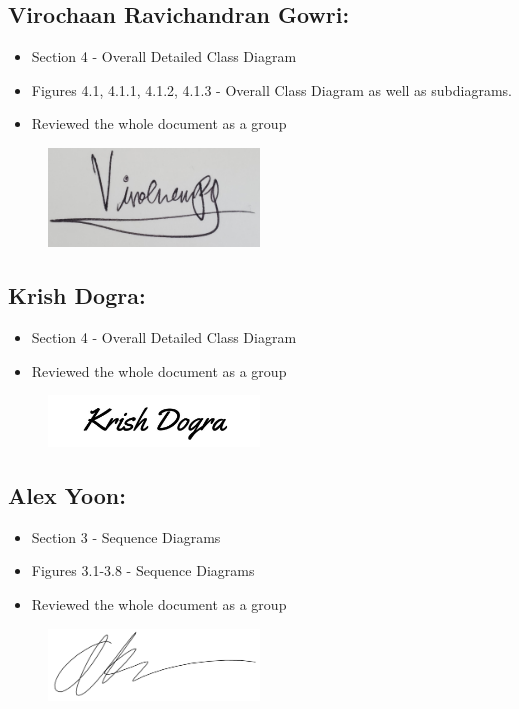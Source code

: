 \documentclass[]{article}
\begin{document}
\subsection*{Virochaan Ravichandran Gowri:}
\begin{itemize}
	\item Section 4 - Overall Detailed Class Diagram
	\item Figures 4.1, 4.1.1, 4.1.2, 4.1.3 - Overall Class Diagram as well as subdiagrams.
	\item Reviewed the whole document as a group
\end{itemize}
\begin{figure}[h]
	\centering
	\includegraphics[width=0.5\textwidth]{../images/ViroSignature.jpg}
	\label{fig:signature}
\end{figure}
\subsection*{Krish Dogra:}
\begin{itemize}
	\item Section 4 - Overall Detailed Class Diagram
	\item Reviewed the whole document as a group
\end{itemize}
\begin{figure}[h]
	\centering
	\includegraphics[width=0.5\textwidth]{../images/KrishSignature.jpg}
	\label{fig:signature}
\end{figure}
\subsection*{Alex Yoon:}
\begin{itemize}
    \item Section 3 - Sequence Diagrams
    \item Figures 3.1-3.8 - Sequence Diagrams
    \item Reviewed the whole document as a group
\end{itemize}
\begin{figure}[h]
    \centering
    \includegraphics[width=0.5\textwidth]{../images/AlexSignature.png}
    \label{fig:signature}
\end{figure}
\end{document}
